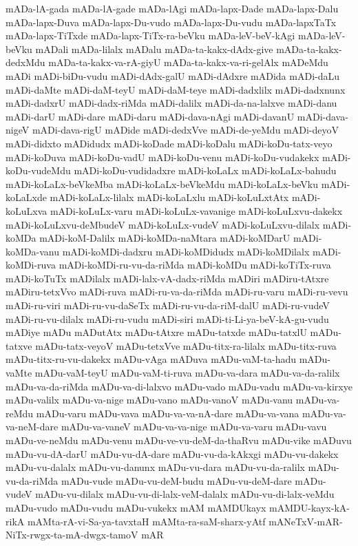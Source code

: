 {mADa-lA-gada
mADa-lA-gade
mADa-lAgi
mADa-lapx-Dade
mADa-lapx-Dalu
mADa-lapx-Duva
mADa-lapx-Du-vudo
mADa-lapx-Du-vudu
mADa-lapxTaTx
mADa-lapx-TiTxde
mADa-lapx-TiTx-ra-beVku
mADa-leV-beV-kAgi
mADa-leV-beVku
mADali
mADa-lilalx
mADalu
mADa-ta-kakx-dAdx-give
mADa-ta-kakx-dedxMdu
mADa-ta-kakx-va-rA-giyU
mADa-ta-kakx-va-ri-gelAlx
mADeMdu
mADi
mADi-biDu-vudu
mADi-dAdx-galU
mADi-dAdxre
mADida
mADi-daLu
mADi-daMte
mADi-daM-teyU
mADi-daM-teye
mADi-dadxlilx
mADi-dadxnunx
mADi-dadxrU
mADi-dadx-riMda
mADi-dalilx
mADi-da-na-lalxve
mADi-danu
mADi-darU
mADi-dare
mADi-daru
mADi-dava-nAgi
mADi-davanU
mADi-dava-nigeV
mADi-dava-rigU
mADide
mADi-dedxVve
mADi-de-yeMdu
mADi-deyoV
mADi-didxto
mADidudx
mADi-koDade
mADi-koDalu
mADi-koDu-tatx-veyo
mADi-koDuva
mADi-koDu-vadU
mADi-koDu-venu
mADi-koDu-vudakekx
mADi-koDu-vudeMdu
mADi-koDu-vudidadxre
mADi-koLaLx
mADi-koLaLx-bahudu
mADi-koLaLx-beVkeMba
mADi-koLaLx-beVkeMdu
mADi-koLaLx-beVku
mADi-koLaLxde
mADi-koLaLx-lilalx
mADi-koLaLxlu
mADi-koLuLxtAtx
mADi-koLuLxva
mADi-koLuLx-varu
mADi-koLuLx-vavanige
mADi-koLuLxvu-dakekx
mADi-koLuLxvu-deMbudeV
mADi-koLuLx-vudeV
mADi-koLuLxvu-dilalx
mADi-koMDa
mADi-koM-Dalilx
mADi-koMDa-naMtara
mADi-koMDarU
mADi-koMDa-vanu
mADi-koMDi-dadxru
mADi-koMDidudx
mADi-koMDilalx
mADi-koMDi-ruva
mADi-koMDi-ru-vu-da-riMda
mADi-koMDu
mADi-koTiTx-ruva
mADi-koTuTx
mADilalx
mADi-lalx-vA-dadx-riMda
mADiri
mADiru-tAtxre
mADiru-tetxVvo
mADi-ruva
mADi-ru-va-da-riMda
mADi-ru-varu
mADi-ru-vevu
mADi-ru-viri
mADi-ru-vu-daSeTx
mADi-ru-vu-da-riM-dalU
mADi-ru-vudeV
mADi-ru-vu-dilalx
mADi-ru-vudu
mADi-siri
mADi-ti-Li-ya-beV-kA-gu-vudu
mADiye
mADu
mADutAtx
mADu-tAtxre
mADu-tatxde
mADu-tatxlU
mADu-tatxve
mADu-tatx-veyoV
mADu-tetxVve
mADu-titx-ra-lilalx
mADu-titx-ruva
mADu-titx-ru-vu-dakekx
mADu-vAga
mADuva
mADu-vaM-ta-hadu
mADu-vaMte
mADu-vaM-teyU
mADu-vaM-ti-ruva
mADu-va-dara
mADu-va-da-ralilx
mADu-va-da-riMda
mADu-va-di-lalxvo
mADu-vado
mADu-vadu
mADu-va-kirxye
mADu-valilx
mADu-va-nige
mADu-vano
mADu-vanoV
mADu-vanu
mADu-va-reMdu
mADu-varu
mADu-vava
mADu-va-va-nA-dare
mADu-va-vana
mADu-va-va-neM-dare
mADu-va-vaneV
mADu-va-va-nige
mADu-va-varu
mADu-vavu
mADu-ve-neMdu
mADu-venu
mADu-ve-vu-deM-da-thaRvu
mADu-vike
mADuvu
mADu-vu-dA-darU
mADu-vu-dA-dare
mADu-vu-da-kAkxgi
mADu-vu-dakekx
mADu-vu-dalalx
mADu-vu-danunx
mADu-vu-dara
mADu-vu-da-ralilx
mADu-vu-da-riMda
mADu-vude
mADu-vu-deM-budu
mADu-vu-deM-dare
mADu-vudeV
mADu-vu-dilalx
mADu-vu-di-lalx-veM-dalalx
mADu-vu-di-lalx-veMdu
mADu-vudo
mADu-vudu
mADu-vukekx
mAM
mAMDUkayx
mAMDU-kayx-kA-rikA
mAMta-rA-vi-Sa-ya-tavxtaH
mAMta-ra-saM-sharx-yAtf
mANeTxV-mAR-NiTx-rwgx-ta-mA-dwgx-tamoV
mAR
}

